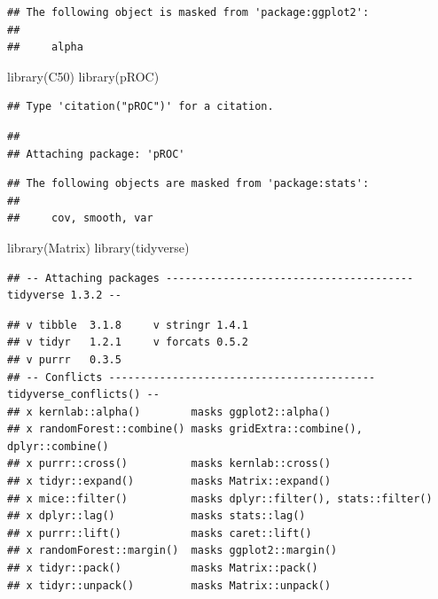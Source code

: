 \documentclass[
]{article}
\newenvironment{Shaded}{\begin{snugshade}}{\end{snugshade}}
\newcommand{\FunctionTok}[1]{\textcolor[rgb]{0.00,0.00,0.00}{#1}}
\newcommand{\NormalTok}[1]{#1}
\newcommand{\StringTok}[1]{\textcolor[rgb]{0.31,0.60,0.02}{#1}}
\begin{document}
\begin{verbatim}
## The following object is masked from 'package:ggplot2':
## 
##     alpha
\end{verbatim}

\begin{Shaded}
\begin{Highlighting}[]
\FunctionTok{library}\NormalTok{(}\StringTok{\textquotesingle{}C50\textquotesingle{}}\NormalTok{)}
\FunctionTok{library}\NormalTok{(}\StringTok{\textquotesingle{}pROC\textquotesingle{}}\NormalTok{)}
\end{Highlighting}
\end{Shaded}

\begin{verbatim}
## Type 'citation("pROC")' for a citation.
\end{verbatim}

\begin{verbatim}
## 
## Attaching package: 'pROC'
\end{verbatim}

\begin{verbatim}
## The following objects are masked from 'package:stats':
## 
##     cov, smooth, var
\end{verbatim}

\begin{Shaded}
\begin{Highlighting}[]
\FunctionTok{library}\NormalTok{(}\StringTok{\textquotesingle{}Matrix\textquotesingle{}}\NormalTok{)}
\FunctionTok{library}\NormalTok{(}\StringTok{\textquotesingle{}tidyverse\textquotesingle{}}\NormalTok{)}
\end{Highlighting}
\end{Shaded}

\begin{verbatim}
## -- Attaching packages --------------------------------------- tidyverse 1.3.2 --
\end{verbatim}

\begin{verbatim}
## v tibble  3.1.8     v stringr 1.4.1
## v tidyr   1.2.1     v forcats 0.5.2
## v purrr   0.3.5     
## -- Conflicts ------------------------------------------ tidyverse_conflicts() --
## x kernlab::alpha()        masks ggplot2::alpha()
## x randomForest::combine() masks gridExtra::combine(), dplyr::combine()
## x purrr::cross()          masks kernlab::cross()
## x tidyr::expand()         masks Matrix::expand()
## x mice::filter()          masks dplyr::filter(), stats::filter()
## x dplyr::lag()            masks stats::lag()
## x purrr::lift()           masks caret::lift()
## x randomForest::margin()  masks ggplot2::margin()
## x tidyr::pack()           masks Matrix::pack()
## x tidyr::unpack()         masks Matrix::unpack()
\end{verbatim}
\end{document}
